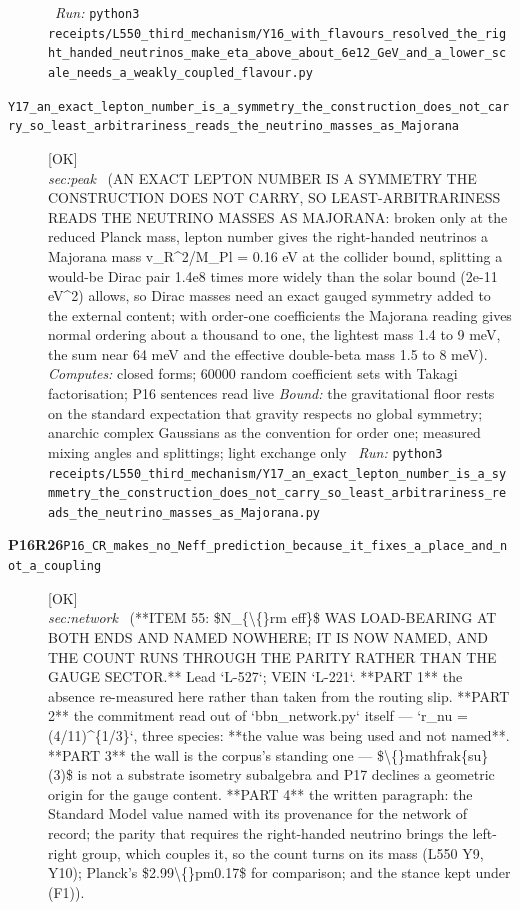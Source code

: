 \begin{description}
\ \emph{Run:} \texttt{python3 receipts/L550\_third\_mechanism/Y16\_with\_flavours\_resolved\_the\_right\_handed\_neutrinos\_make\_eta\_above\_about\_6e12\_GeV\_and\_a\_lower\_scale\_needs\_a\_weakly\_coupled\_flavour.py}
\item[\label{rcpt:Y17_an_exact_lepton_number_is_a_symmetry_the_construction_does_not_carry_so_least_arbitrariness_reads_the_neutrino_masses_as_Majorana}\textbf{}\quad\texttt{Y17\_an\_exact\_lepton\_number\_is\_a\_symmetry\_the\_construction\_does\_not\_carry\_so\_least\_arbitrariness\_reads\_the\_neutrino\_masses\_as\_Majorana}]\hfill\textsf{[OK]}\\
\textit{sec:peak} \ (AN EXACT LEPTON NUMBER IS A SYMMETRY THE CONSTRUCTION DOES NOT CARRY, SO LEAST-ARBITRARINESS READS THE NEUTRINO MASSES AS MAJORANA: broken only at the reduced Planck mass, lepton number gives the right-handed neutrinos a Majorana mass v\_R\textasciicircum{}2/M\_Pl = 0.16 eV at the collider bound, splitting a would-be Dirac pair 1.4e8 times more widely than the solar bound (2e-11 eV\textasciicircum{}2) allows, so Dirac masses need an exact gauged symmetry added to the external content; with order-one coefficients the Majorana reading gives normal ordering about a thousand to one, the lightest mass 1.4 to 9 meV, the sum near 64 meV and the effective double-beta mass 1.5 to 8 meV). 
\emph{Computes:} closed forms; 60000 random coefficient sets with Takagi factorisation; P16 sentences read live
 \emph{Bound:} the gravitational floor rests on the standard expectation that gravity respects no global symmetry; anarchic complex Gaussians as the convention for order one; measured mixing angles and splittings; light exchange only
\ \emph{Run:} \texttt{python3 receipts/L550\_third\_mechanism/Y17\_an\_exact\_lepton\_number\_is\_a\_symmetry\_the\_construction\_does\_not\_carry\_so\_least\_arbitrariness\_reads\_the\_neutrino\_masses\_as\_Majorana.py}
\item[\rcptlabel{P16_CR_makes_no_Neff_prediction_because_it_fixes_a_place_and_not_a_coupling}{P16R26}\textbf{P16R26}\quad\texttt{P16\_CR\_makes\_no\_Neff\_prediction\_because\_it\_fixes\_a\_place\_and\_not\_a\_coupling}]\hfill\textsf{[OK]}\\
\textit{sec:network} \ (**ITEM 55: \$N\_\{\textbackslash\{\}rm eff\}\$ WAS LOAD-BEARING AT BOTH ENDS AND NAMED NOWHERE; IT IS NOW NAMED, AND THE COUNT RUNS THROUGH THE PARITY RATHER THAN THE GAUGE SECTOR.** Lead `L-527`; VEIN `L-221`. **PART 1** the absence re-measured here rather than taken from the routing slip. **PART 2** the commitment read out of `bbn\_network.py` itself --- `r\_nu = (4/11)\textasciicircum{}\{1/3\}`, three species: **the value was being used and not named**. **PART 3** the wall is the corpus's standing one --- \$\textbackslash\{\}mathfrak\{su\}(3)\$ is not a substrate isometry subalgebra and P17 declines a geometric origin for the gauge content. **PART 4** the written paragraph: the Standard Model value named with its provenance for the network of record; the parity that requires the right-handed neutrino brings the left-right group, which couples it, so the count turns on its mass (L550 Y9, Y10); Planck's \$2.99\textbackslash\{\}pm0.17\$ for comparison; and the stance kept under (F1)). 

\end{description}
